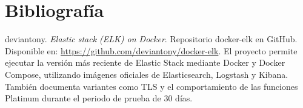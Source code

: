 \documentclass[
  coursetitle={Cómputo Nube y Tecnologías Emergentes},
  coursehours={96},
  coursedate={Verano 2026},
  doctype={Práctica},
  otherlangs={english,french},
  authorname={Lázaro},
  authorsurname={Bustio-Martínez},
  authortitle={PhD},
  role={Profesor Investigador},
  email={lbustio@inaoe.mx},
  phone={5559504000},
  ext={7459},
  institution={Instituto Nacional de Astrofísica, Óptica y Electrónica (INAOE)},
  department={Maestría en Ciencias en Tecnologías de Seguridad},
  address={Luis Enrique Erro 1, Sta. Ma. Tonantzintla, San Andrés Cholula, CP 72840, Puebla, México},
  margin={0.5in}
]{../../lbustio_lecture_notes}
\begin{document}
\section{Bibliografía}

\begin{thebibliography}{9}

deviantony.
\textit{Elastic stack (ELK) on Docker}.
Repositorio docker-elk en GitHub.
Disponible en: \url{https://github.com/deviantony/docker-elk}.
El proyecto permite ejecutar la versión más reciente de Elastic Stack mediante Docker y Docker Compose, utilizando imágenes oficiales de Elasticsearch, Logstash y Kibana. También documenta variantes como TLS y el comportamiento de las funciones Platinum durante el periodo de prueba de 30 días.

\end{thebibliography}
\end{document}
